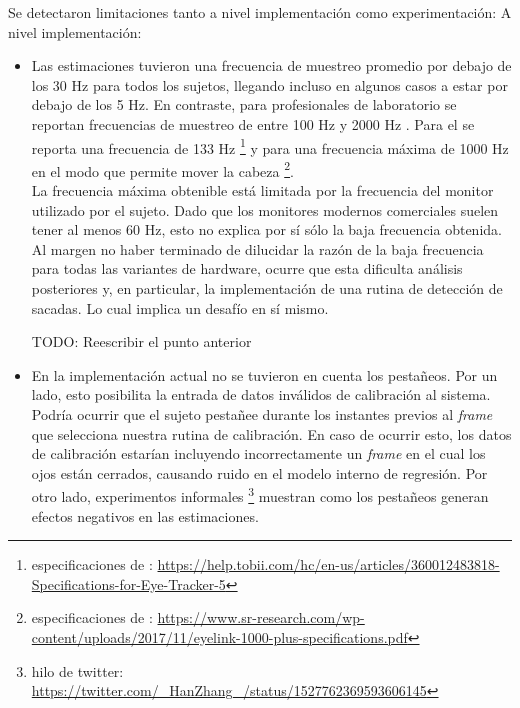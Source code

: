 Se detectaron limitaciones tanto a nivel implementación como experimentación:
A nivel implementación: 

\begin{itemize}
  \item Las estimaciones tuvieron una frecuencia de muestreo promedio por
debajo de los 30 Hz para todos los sujetos, llegando incluso en algunos casos a
estar por debajo de los 5 Hz.
  En contraste, para \eyetrackers profesionales de laboratorio se reportan
frecuencias de muestreo de entre 100 Hz y 2000 Hz \cite{hosp_2020_remote_eye}.
  Para el \tobii se reporta una frecuencia de 133 Hz \footnote{especificaciones
de \tobii:
\url{https://help.tobii.com/hc/en-us/articles/360012483818-Specifications-for-Eye-Tracker-5}}
y para \eyelink una frecuencia máxima de 1000 Hz en el modo que permite mover
la cabeza \footnote{especificaciones de \eyelink:
\url{https://www.sr-research.com/wp-content/uploads/2017/11/eyelink-1000-plus-specifications.pdf}}.
\\
  La frecuencia máxima obtenible está limitada por la frecuencia del monitor
utilizado por el sujeto.
  Dado que los monitores modernos comerciales suelen tener al menos 60 Hz, esto
no explica por sí sólo la baja frecuencia obtenida. \\
  Al margen no haber terminado de dilucidar la razón de la baja frecuencia para
todas las variantes de hardware, ocurre que esta dificulta análisis posteriores
y, en particular, la implementación de una rutina de detección de sacadas.
  Lo cual implica un desafío en sí mismo.

  TODO: Reescribir el punto anterior

  \item En la implementación actual no se tuvieron en cuenta los pestañeos.
  Por un lado, esto posibilita la entrada de datos inválidos de calibración al
sistema.
  Podría ocurrir que el sujeto pestañee durante los instantes previos al
\textit{frame} que selecciona nuestra rutina de calibración.
  En caso de ocurrir esto, los datos de calibración estarían incluyendo
incorrectamente un \textit{frame} en el cual los ojos están cerrados, causando
ruido en el modelo interno de regresión.
  Por otro lado, experimentos informales \footnote{hilo de twitter:
\url{https://twitter.com/_HanZhang_/status/1527762369593606145}} muestran como
los pestañeos generan efectos negativos en las estimaciones.


\end{itemize}
